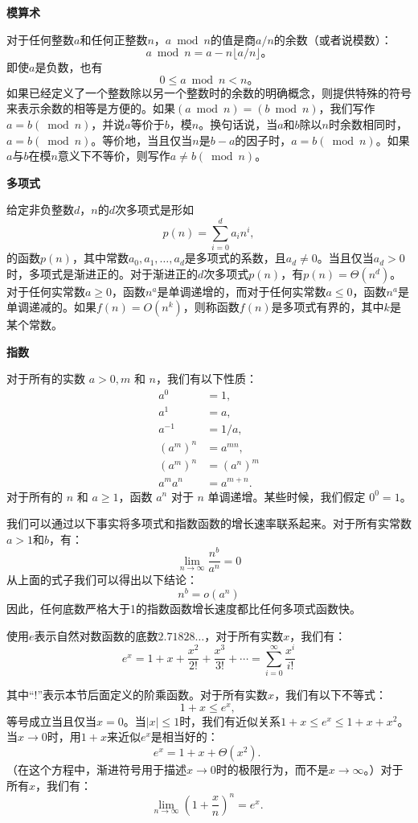 \documentclass[lang=cn,newtx,10pt,scheme=chinese]{elegantbook}
\begin{document}
\textbf{模算术}

对于任何整数$a$和任何正整数$n$，$a \bmod n$的值是商$a / n$的余数（或者说模数）：
$$
a \bmod n=a-n\lfloor a / n\rfloor。
$$
即使$a$是负数，也有
$$
0 \leq a \bmod n<n。
$$
如果已经定义了一个整数除以另一个整数时的余数的明确概念，则提供特殊的符号来表示余数的相等是方便的。如果$(a \bmod n)=(b \bmod n)$，我们写作$a=b(\bmod n)$，并说$a$等价于$b$，模$n$。换句话说，当$a$和$b$除以$n$时余数相同时，$a=b(\bmod n)$。等价地，当且仅当$n$是$b-a$的因子时，$a=b(\bmod n)$。如果$a$与$b$在模$n$意义下不等价，则写作$a \neq b(\bmod n)$。

\textbf{多项式}

给定非负整数$d$，$n$的$d$次多项式是形如
$$
p(n)=\sum_{i=0}^d a_i n^i,
$$
的函数$p(n)$，其中常数$a_0, a_1, \ldots, a_d$是多项式的系数，且$a_d \neq 0$。当且仅当$a_d>0$时，多项式是渐进正的。对于渐进正的$d$次多项式$p(n)$，有$p(n)=\Theta\left(n^d\right)$。对于任何实常数$a \geq 0$，函数$n^a$是单调递增的，而对于任何实常数$a \leq 0$，函数$n^a$是单调递减的。如果$f(n)=O\left(n^k\right)$，则称函数$f(n)$是多项式有界的，其中$k$是某个常数。

\textbf{指数}

对于所有的实数 $a>0, m$ 和 $n$，我们有以下性质：
$$
\begin{aligned}
a^0 & =1, \\
a^1 & =a, \\
a^{-1} & =1 / a, \\
\left(a^m\right)^n & =a^{m n}, \\
\left(a^m\right)^n & =\left(a^n\right)^m \\
a^m a^n & =a^{m+n} .
\end{aligned}
$$
对于所有的 $n$ 和 $a \geq 1$，函数 $a^n$ 对于 $n$ 单调递增。某些时候，我们假定 $0^0=1$。

我们可以通过以下事实将多项式和指数函数的增长速率联系起来。对于所有实常数$a>1$和$b$，有：
$$
\lim _{n \rightarrow \infty} \frac{n^b}{a^n}=0
$$
从上面的式子我们可以得出以下结论：
$$
n^b=o\left(a^n\right)
$$
因此，任何底数严格大于1的指数函数增长速度都比任何多项式函数快。

使用$e$表示自然对数函数的底数$2.71828 \ldots$，对于所有实数$x$，我们有：
$$
e^x=1+x+\frac{x^2}{2 !}+\frac{x^3}{3 !}+\cdots=\sum_{i=0}^{\infty} \frac{x^i}{i !}
$$

其中“!”表示本节后面定义的阶乘函数。对于所有实数$x$，我们有以下不等式：
$$
1+x \leq e^x \text {, }
$$
等号成立当且仅当$x=0$。当$|x| \leq 1$时，我们有近似关系$1+x \leq e^x \leq 1+x+x^2$。当$x \rightarrow 0$时，用$1+x$来近似$e^x$是相当好的：
$$
e^x=1+x+\Theta\left(x^2\right) \text {. }
$$
（在这个方程中，渐进符号用于描述$x \rightarrow 0$时的极限行为，而不是$x \rightarrow \infty$。）对于所有$x$，我们有：
$$
\lim _{n \rightarrow \infty}\left(1+\frac{x}{n}\right)^n=e^x \text {. }
$$
\end{document}
